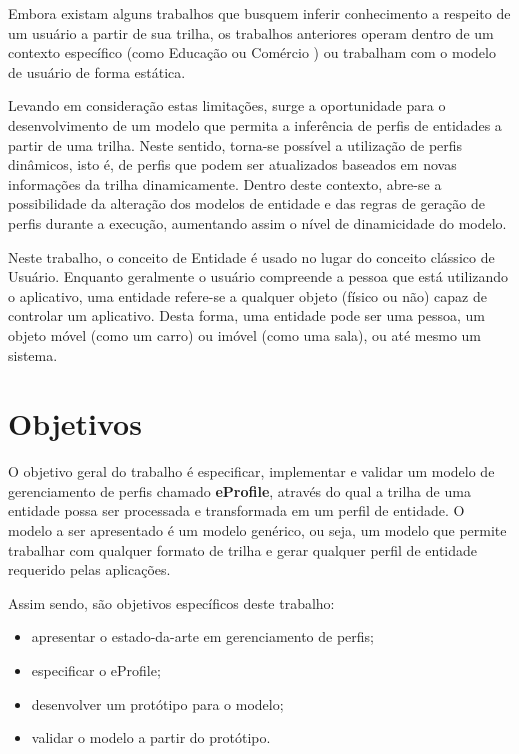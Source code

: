 Embora existam alguns trabalhos que busquem inferir conhecimento a respeito de um usuário a partir de sua trilha, os trabalhos anteriores operam dentro de um contexto específico (como Educação \cite{barbosa11} ou Comércio \cite{franco11}) ou trabalham com o modelo de usuário de forma estática.

Levando em consideração estas limitações, surge a oportunidade para o desenvolvimento de um modelo que permita a inferência de perfis de entidades a partir de uma trilha. Neste sentido, torna-se possível a utilização de perfis dinâmicos, isto é, de perfis que podem ser atualizados baseados em novas informações da trilha dinamicamente. Dentro deste contexto, abre-se a possibilidade da alteração dos modelos de entidade e das regras de geração de perfis durante a execução, aumentando assim o nível de dinamicidade do modelo.

Neste trabalho, o conceito de Entidade é usado no lugar do conceito clássico de Usuário. Enquanto geralmente o usuário compreende a pessoa que está utilizando o aplicativo, uma entidade refere-se a qualquer objeto (físico ou não) capaz de controlar um aplicativo. Desta forma, uma entidade pode ser uma pessoa, um objeto móvel (como um carro) ou imóvel (como uma sala), ou até mesmo um sistema.


\section{Objetivos}
\label{sec:objetivos}

O objetivo geral do trabalho é especificar, implementar e validar um modelo de gerenciamento de perfis chamado {\bf eProfile}, através do qual a trilha de uma entidade possa ser processada e transformada em um perfil de entidade. O modelo a ser apresentado é um modelo genérico, ou seja, um modelo que permite trabalhar com qualquer formato de trilha e gerar qualquer perfil de entidade requerido pelas aplicações.

Assim sendo, são objetivos específicos deste trabalho:

\begin{itemize}

  \item apresentar o estado-da-arte em gerenciamento de perfis;
  \item especificar o eProfile;
  \item desenvolver um protótipo para o modelo;
  \item validar o modelo a partir do protótipo.

\end{itemize}

